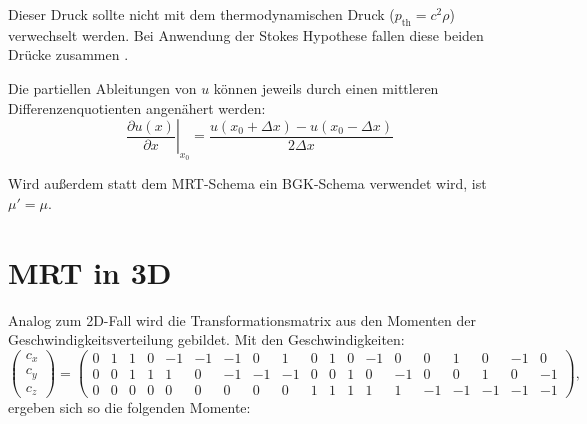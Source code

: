 Dieser Druck sollte nicht mit dem thermodynamischen Druck ($p_{\text{th}}=c^2 \rho$) verwechselt werden. Bei Anwendung der Stokes Hypothese fallen diese beiden Drücke zusammen \cite{Graves1999}.

Die partiellen Ableitungen von $u$ können jeweils durch einen mittleren Differenzenquotienten angenähert werden:
\begin{equation}
 \left. \frac{\partial u(x)}{\partial x}\right|_{x_0} = \frac{u(x_0 + \Delta x) - u(x_0 - \Delta x)}{2 \Delta x}
\end{equation}

Wird außerdem statt dem MRT-Schema ein BGK-Schema verwendet wird, ist $\mu' =  \mu$.

\section{MRT in 3D}
Analog zum 2D-Fall wird die Transformationsmatrix aus den Momenten der Geschwindigkeitsverteilung gebildet.
Mit den Geschwindigkeiten:
\begin{equation}
\left(\begin{smallmatrix} 
c_x \\
c_y \\
c_z
\end{smallmatrix} \right) = 
\left(\begin{smallmatrix} 
0 & 1 & 1 & 0 & -1 & -1 & -1 &  0 &  1 & 0 & 1 & 0 & -1 &  0 & 0  &  1 &  0 & -1 & 0 \\
0 & 0 & 1 & 1 &  1 &  0 & -1 & -1 & -1 & 0 & 0 & 1 &  0 & -1 & 0  &  0 &  1 &  0 & -1 \\
0 & 0 & 0 & 0 &  0 &  0 &  0 &  0 &  0 & 1 & 1 & 1 &  1 &  1 & -1 & -1 & -1 & -1 & -1
\end{smallmatrix} \right) ,
\end{equation}
ergeben sich so die folgenden Momente:
